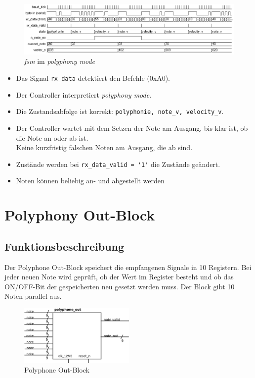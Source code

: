 \begin{figure}[H]
	\includegraphics[width=1\textwidth]{images/midi_control/wave_polyphonie.png}
	\caption{\textit{fsm} im \textit{polyphony mode}}
	\label{fig.midicontrol_polyphonie}
\end{figure}

\begin{itemize}
	\item Das Signal \lstinline|rx_data| detektiert den Befehle (0xA0).
	\item Der Controller interpretiert  \textit{polyphony mode}. 
	\item Die Zustandsabfolge ist korrekt: \lstinline|polyphonie, note_v, velocity_v|.
	\item Der Controller wartet mit dem Setzen der Note am Ausgang, bis klar ist, ob die Note an oder ab ist.\\
	Keine kurzfristig falschen Noten am Ausgang, die ab sind.
	\item Zustände werden bei \lstinline|rx_data_valid = '1'| die Zustände geändert.
	\item Noten können beliebig an- und abgestellt werden
\end{itemize}

\section{Polyphony Out-Block}\label{sect.polyphonie_umsetzung}
 
\subsection{Funktionsbeschreibung}

Der Polyphone Out-Block speichert die empfangenen Signale in 10 Registern. Bei jeder neuen Note wird geprüft, ob der Wert im Register besteht und ob das ON/OFF-Bit der gespeicherten neu gesetzt werden muss. Der Block gibt 10 Noten parallel aus.

\begin{figure}[H]
	\includegraphics[width=0.5\textwidth]{images/midi_interface/polyphonie_blockschaltbild.png}
	\caption{Polyphone Out-Block}
	\label{fig.polyphnie_out_block}
\end{figure}


